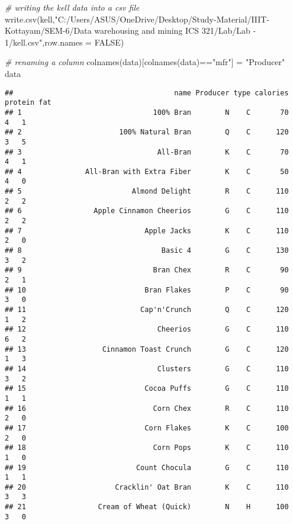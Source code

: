 \documentclass[
]{article}
\newenvironment{Shaded}{\begin{snugshade}}{\end{snugshade}}
\newcommand{\AttributeTok}[1]{\textcolor[rgb]{0.77,0.63,0.00}{#1}}
\newcommand{\CommentTok}[1]{\textcolor[rgb]{0.56,0.35,0.01}{\textit{#1}}}
\newcommand{\ConstantTok}[1]{\textcolor[rgb]{0.00,0.00,0.00}{#1}}
\newcommand{\FunctionTok}[1]{\textcolor[rgb]{0.00,0.00,0.00}{#1}}
\newcommand{\NormalTok}[1]{#1}
\newcommand{\OtherTok}[1]{\textcolor[rgb]{0.56,0.35,0.01}{#1}}
\newcommand{\SpecialCharTok}[1]{\textcolor[rgb]{0.00,0.00,0.00}{#1}}
\newcommand{\StringTok}[1]{\textcolor[rgb]{0.31,0.60,0.02}{#1}}
\begin{document}
\begin{Shaded}
\begin{Highlighting}[]
\CommentTok{\# writing the kell data into a csv file}
\FunctionTok{write.csv}\NormalTok{(kell,}\StringTok{"C:/Users/ASUS/OneDrive/Desktop/Study{-}Material/IIIT{-}Kottayam/SEM{-}6/Data warehousing and mining ICS 321/Lab/Lab {-} 1/kell.csv"}\NormalTok{,}\AttributeTok{row.names =} \ConstantTok{FALSE}\NormalTok{)}

\CommentTok{\# renaming a column}
\FunctionTok{colnames}\NormalTok{(data)[}\FunctionTok{colnames}\NormalTok{(data)}\SpecialCharTok{==}\StringTok{"mfr"}\NormalTok{] }\OtherTok{=} \StringTok{"Producer"}
\NormalTok{data}
\end{Highlighting}
\end{Shaded}

\begin{verbatim}
##                                      name Producer type calories protein fat
## 1                               100% Bran        N    C       70       4   1
## 2                       100% Natural Bran        Q    C      120       3   5
## 3                                All-Bran        K    C       70       4   1
## 4               All-Bran with Extra Fiber        K    C       50       4   0
## 5                          Almond Delight        R    C      110       2   2
## 6                 Apple Cinnamon Cheerios        G    C      110       2   2
## 7                             Apple Jacks        K    C      110       2   0
## 8                                 Basic 4        G    C      130       3   2
## 9                               Bran Chex        R    C       90       2   1
## 10                            Bran Flakes        P    C       90       3   0
## 11                           Cap'n'Crunch        Q    C      120       1   2
## 12                               Cheerios        G    C      110       6   2
## 13                  Cinnamon Toast Crunch        G    C      120       1   3
## 14                               Clusters        G    C      110       3   2
## 15                            Cocoa Puffs        G    C      110       1   1
## 16                              Corn Chex        R    C      110       2   0
## 17                            Corn Flakes        K    C      100       2   0
## 18                              Corn Pops        K    C      110       1   0
## 19                          Count Chocula        G    C      110       1   1
## 20                     Cracklin' Oat Bran        K    C      110       3   3
## 21                 Cream of Wheat (Quick)        N    H      100       3   0

\end{verbatim}
\end{document}
